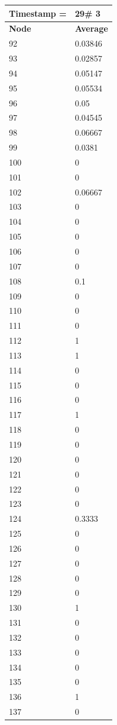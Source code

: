 \begin{tabular}{|l||l|}
\hline
\textbf{Timestamp =} & \textbf{29}\# 3\\\hline
	\textbf{Node} & \textbf{Average} \\ \hline
\hline
	92 & 0.03846 \\ \hline
	93 & 0.02857 \\ \hline
	94 & 0.05147 \\ \hline
	95 & 0.05534 \\ \hline
	96 & 0.05 \\ \hline
	97 & 0.04545 \\ \hline
	98 & 0.06667 \\ \hline
	99 & 0.0381 \\ \hline
	100 & 0 \\ \hline
	101 & 0 \\ \hline
	102 & 0.06667 \\ \hline
	103 & 0 \\ \hline
	104 & 0 \\ \hline
	105 & 0 \\ \hline
	106 & 0 \\ \hline
	107 & 0 \\ \hline
	108 & 0.1 \\ \hline
	109 & 0 \\ \hline
	110 & 0 \\ \hline
	111 & 0 \\ \hline
	112 & 1 \\ \hline
	113 & 1 \\ \hline
	114 & 0 \\ \hline
	115 & 0 \\ \hline
	116 & 0 \\ \hline
	117 & 1 \\ \hline
	118 & 0 \\ \hline
	119 & 0 \\ \hline
	120 & 0 \\ \hline
	121 & 0 \\ \hline
	122 & 0 \\ \hline
	123 & 0 \\ \hline
	124 & 0.3333 \\ \hline
	125 & 0 \\ \hline
	126 & 0 \\ \hline
	127 & 0 \\ \hline
	128 & 0 \\ \hline
	129 & 0 \\ \hline
	130 & 1 \\ \hline
	131 & 0 \\ \hline
	132 & 0 \\ \hline
	133 & 0 \\ \hline
	134 & 0 \\ \hline
	135 & 0 \\ \hline
	136 & 1 \\ \hline
	137 & 0 \\ \hline
\end{tabular}

